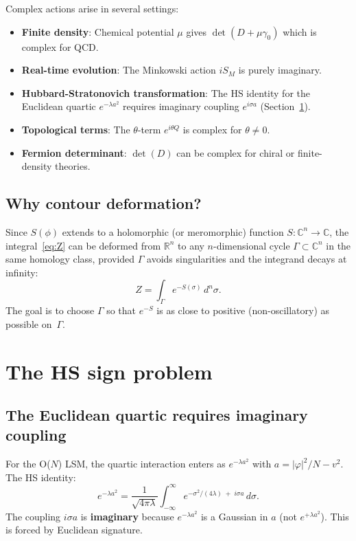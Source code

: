 \documentclass[12pt]{article}
\theoremstyle{definition}
\theoremstyle{remark}
\newcommand{\R}{\mathbb{R}}
\newcommand{\C}{\mathbb{C}}
\newcommand{\ph}{\varphi}
\begin{document}
Complex actions arise in several settings:
\begin{itemize}
\item \textbf{Finite density}: Chemical potential $\mu$ gives
  $\det(D+\mu\gamma_0)$ which is complex for QCD.
\item \textbf{Real-time evolution}: The Minkowski action $iS_M$ is
  purely imaginary.
\item \textbf{Hubbard-Stratonovich transformation}: The HS identity
  for the Euclidean quartic $e^{-\lambda a^2}$ requires imaginary
  coupling $e^{i\sigma a}$ (Section~\ref{sec:HS}).
\item \textbf{Topological terms}: The $\theta$-term $e^{i\theta Q}$
  is complex for $\theta \ne 0$.
\item \textbf{Fermion determinant}: $\det(D)$ can be complex for
  chiral or finite-density theories.
\end{itemize}

\subsection{Why contour deformation?}

Since $S(\phi)$ extends to a holomorphic (or meromorphic) function
$S : \C^n \to \C$, the integral~\eqref{eq:Z} can be deformed from
$\R^n$ to any $n$-dimensional cycle $\Gamma \subset \C^n$ in the
same homology class, provided $\Gamma$ avoids singularities and the
integrand decays at infinity:
\begin{equation}
  Z = \int_\Gamma e^{-S(\sigma)}\,d^n\sigma.
\end{equation}
The goal is to choose $\Gamma$ so that $e^{-S}$ is as close to
positive (non-oscillatory) as possible on~$\Gamma$.

\section{The HS sign problem}\label{sec:HS}

\subsection{The Euclidean quartic requires imaginary coupling}

For the O($N$) LSM, the quartic interaction enters as $e^{-\lambda a^2}$
with $a = |\ph|^2/N - v^2$. The HS identity:
\begin{equation}
  e^{-\lambda a^2}
    = \frac{1}{\sqrt{4\pi\lambda}}\int_{-\infty}^{\infty}
      e^{-\sigma^2/(4\lambda)\;+\;i\sigma a}\,d\sigma.
\end{equation}
The coupling $i\sigma a$ is \textbf{imaginary} because $e^{-\lambda a^2}$
is a Gaussian in $a$ (not $e^{+\lambda a^2}$). This is forced by
Euclidean signature.
\end{document}
